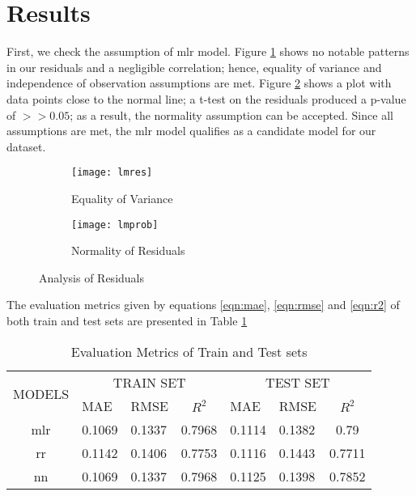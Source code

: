 \begin{sloppypar}
	
	\section{Results}
	First, we check the assumption of \ac{mlr} model. Figure \ref{fig:var} shows no notable patterns in our residuals and a negligible correlation; hence, equality of variance and independence of observation assumptions are met. Figure \ref{fig:norm} shows a plot with data points close to the normal line; a t-test on the residuals produced a p-value of $ >> 0.05 $; as a result, the normality assumption can be accepted. Since all assumptions are met, the \ac{mlr} model qualifies as a candidate model for our dataset.
	\vspace*{0.5cm}
	
	\begin{figure}[h]
		\centering
		\begin{subfigure}[h]{0.47\textwidth}
			\centering
			\texttt{[image: lmres]}
			\caption{Equality of Variance}
			\label{fig:var}
		\end{subfigure}
		\hfill
		\begin{subfigure}[h]{0.47\textwidth}
			\centering
			\texttt{[image: lmprob]}
			\caption{Normality of Residuals}
			\label{fig:norm}
		\end{subfigure}
		\caption{Analysis of Residuals}
		\label{fig:allerr}
	\end{figure}
	
	\hspace*{-0.6cm}The evaluation metrics given by equations \ref{eqn:mae}, \ref{eqn:rmse} and \ref{eqn:r2} of both train and test sets are presented in Table \ref{table:metric}
	
	\begin{table}[h!]
		\centering
		\caption{Evaluation Metrics of Train and Test sets}
		\label{table:metric}
		\begin{tabular}{|c|p{1.5cm}p{1.5cm}c|p{1.5cm}p{1.5cm}c|}
			\hline
			\multirow{2}{*}{MODELS} & \multicolumn{3}{|c|}{TRAIN SET} & \multicolumn{3}{|c|}{TEST SET} \\ \cline{2-7}
			& MAE & RMSE & $R^2$ & MAE & RMSE & $R^2$ \\ \hline
			\ac{mlr} & 0.1069 & 0.1337 & 0.7968 & 0.1114 & 0.1382 & 0.79 \\
			\ac{rr} & 0.1142 & 0.1406 & 0.7753 & 0.1116 & 0.1443 & 0.7711 \\
			\ac{nn} & 0.1069 & 0.1337 & 0.7968 & 0.1125 & 0.1398 & 0.7852 \\ \hline
		\end{tabular}
	\end{table} 
	

\end{sloppypar}
